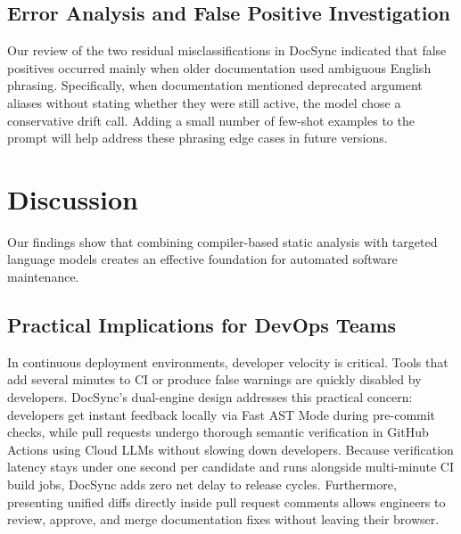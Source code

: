 \documentclass[12pt,onecolumn,draftclsnofoot]{IEEEtran}
\begin{document}
\subsection{Error Analysis and False Positive Investigation}
Our review of the two residual misclassifications in DocSync indicated that false positives occurred mainly when older documentation used ambiguous English phrasing. Specifically, when documentation mentioned deprecated argument aliases without stating whether they were still active, the model chose a conservative drift call. Adding a small number of few-shot examples to the prompt will help address these phrasing edge cases in future versions.

\section{Discussion}
Our findings show that combining compiler-based static analysis with targeted language models creates an effective foundation for automated software maintenance.

\subsection{Practical Implications for DevOps Teams}
In continuous deployment environments, developer velocity is critical. Tools that add several minutes to CI or produce false warnings are quickly disabled by developers. DocSync's dual-engine design addresses this practical concern: developers get instant feedback locally via Fast AST Mode during pre-commit checks, while pull requests undergo thorough semantic verification in GitHub Actions using Cloud LLMs without slowing down developers. Because verification latency stays under one second per candidate and runs alongside multi-minute CI build jobs, DocSync adds zero net delay to release cycles. Furthermore, presenting unified diffs directly inside pull request comments allows engineers to review, approve, and merge documentation fixes without leaving their browser.
\end{document}
